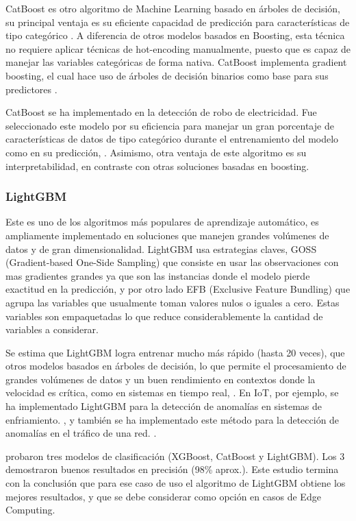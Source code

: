 \documentclass[11pt,a4paper,spanish]{book}
\numberwithin{equation}{chapter}
\numberwithin{figure}{chapter}
\begin{document}
CatBoost es otro algoritmo de Machine Learning basado en árboles de decisión, su principal ventaja es su eficiente capacidad de predicción para características de tipo categórico  \cite{ibrahim2020catboost}. A diferencia de otros modelos basados en Boosting, esta técnica no requiere aplicar técnicas de hot-encoding manualmente, puesto que es capaz de manejar las variables categóricas de forma nativa. CatBoost implementa gradient boosting, el cual hace uso de árboles de decisión binarios como base para sus predictores \cite{prokhorenkova2018catboost}.


CatBoost se ha implementado en la detección de robo de electricidad. Fue seleccionado este modelo por su eficiencia para manejar un gran porcentaje de características de datos de tipo categórico durante el entrenamiento del modelo como en su predicción, \cite{hussain2021catboost}. Asimismo, otra ventaja de este algoritmo es su interpretabilidad, en contraste con otras soluciones basadas en boosting. 


\subsubsection{LightGBM}


Este es uno de los algoritmos más populares de aprendizaje automático, es ampliamente implementado en soluciones que manejen grandes volúmenes de datos y de gran dimensionalidad. LightGBM usa estrategias claves, GOSS (Gradient-based One-Side Sampling) que consiste en usar las observaciones con mas gradientes grandes ya que son las instancias donde el modelo pierde exactitud en la predicción, y por otro lado EFB (Exclusive Feature Bundling) que agrupa las variables que usualmente toman valores nulos o iguales a cero. Estas variables son empaquetadas lo que reduce considerablemente la cantidad de variables a considerar.


Se estima que LightGBM logra entrenar mucho más rápido (hasta 20 veces), que otros modelos basados en árboles de decisión, lo que permite el procesamiento de grandes volúmenes de datos y un buen rendimiento en contextos donde la velocidad es crítica, como en sistemas en tiempo real, \cite{ke2017lightgbm}. En IoT, por ejemplo, se ha implementado LightGBM para la detección de anomalías en sistemas de enfriamiento. \cite{yanabe2020lightgbm}, y también se ha implementado este método para la detección de anomalías en el tráfico de una red. \cite{islam2020lightgbm}. 


\cite{delasmorenas2025bearing} probaron tres modelos de clasificación (XGBoost, CatBoost y LightGBM). Los 3 demostraron buenos resultados en precisión (98\% aprox.). Este estudio termina con la conclusión que para ese caso de uso el algoritmo de LightGBM obtiene los mejores resultados, y que se debe considerar como opción en casos de Edge Computing.
\end{document}
